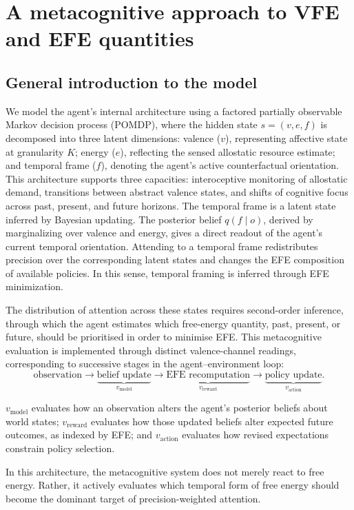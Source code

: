 \documentclass[11pt,a4paper]{article}
\newcommand{\rr}{\color{red!70!black}}
\begin{document}
\section{A metacognitive approach to VFE and EFE quantities}



\subsection{General introduction to the model}\label{sec:decoupled}

{\rr


We model the agent's internal architecture using a factored partially observable Markov decision process (POMDP), where the hidden state $s = (v, e, f)$ is decomposed into three latent dimensions: valence ($v$), representing affective state at granularity $K$; energy ($e$), reflecting the sensed allostatic resource estimate; and temporal frame ($f$), denoting the agent's active counterfactual orientation. This architecture supports three capacities: interoceptive monitoring of allostatic demand, transitions between abstract valence states, and shifts of cognitive focus across past, present, and future horizons. The temporal frame is a latent state inferred by Bayesian updating. The posterior belief $q(f \mid o)$, derived by marginalizing over valence and energy, gives a direct readout of the agent's current temporal orientation. Attending to a temporal frame redistributes precision over the corresponding latent states and changes the EFE composition of available policies. In this sense, temporal framing is inferred through EFE minimization.


The distribution of attention across these states requires second-order inference, through which the agent estimates which free-energy quantity, past, present, or future, should be prioritised in order to minimise EFE. This metacognitive evaluation is implemented through distinct valence-channel readings, corresponding to successive stages in the agent--environment loop:
\[
\text{observation}
\rightarrow
\underbrace{\text{belief update}}_{v_{\text{model}}}
\rightarrow
\underbrace{\text{EFE recomputation}}_{v_{\text{reward}}}
\rightarrow
\underbrace{\text{policy update}}_{v_{\text{action}}}.
\]


$v_{\text{model}}$ evaluates how an observation alters the agent's posterior beliefs about world states; 
$v_{\text{reward}}$ evaluates how those updated beliefs alter expected future outcomes, as indexed by EFE; 
and $v_{\text{action}}$ evaluates how revised expectations constrain policy selection.

In this architecture, the metacognitive system does not merely react to free energy. Rather, it actively evaluates which temporal form of free energy should become the dominant target of precision-weighted attention.}
\end{document}
